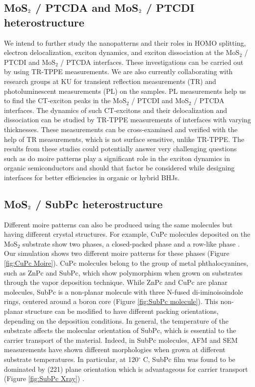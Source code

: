 \documentclass[12pt]{article}
\begin{document}
\subsection{MoS$\protect_2$ / PTCDA and MoS$\protect_2$ / PTCDI heterostructure}
 We intend to further study the nanopatterns and their roles in HOMO splitting, electron delocalization, exciton dynamics, and exciton dissociation at the MoS$_2$ / PTCDI and MoS$_2$ / PTCDA interfaces. These investigations can be carried out by using TR-TPPE measurements. We are also currently collaborating with research groups at KU for transient reflection measurements (TR) and photoluminescent measurements (PL) on the samples. PL measurements help us to find the CT-exciton peaks in the MoS$_2$ / PTCDI and MoS$_2$ / PTCDA interfaces. The dynamics of such CT-excitons and their delocalization and dissociation can be studied by TR-TPPE measurements of interfaces with varying thicknesses. These measurements can be cross-examined and verified with the help of TR measurements, which is not surface sensitive, unlike TR-TPPE. The results from these studies could potentially answer very challenging questions such as do moire patterns play a significant role in the exciton dynamics in organic semiconductors and should that factor be considered while designing interfaces for better efficiencies in organic or hybrid BHJs.

\subsection{MoS$\protect_2$ / SubPc heterostructure}
Different moire patterns can also be produced using the same molecules but having different crystal structures. For example, CuPc molecules deposited on the MoS$_2$ substrate show two phases, a closed-packed phase and a row-like phase \cite{ludwig1994epitaxy}. Our simulation shows two different moire patterns for these phases (Figure \ref{fig:CuPc Moire}). CuPc molecules belong to the group of metal phthalocyanines, such as ZnPc and SubPc, which show polymorphism when grown on substrates through the vapor deposition technique. While ZnPc and CuPc are planar molecules, SubPc is a non-planar molecule with three N-fused di-iminoisoindole rings, centered around a boron core (Figure \ref{fig:SubPc molecule}). This non-planar structure can be modified to have different packing orientations, depending on the deposition conditions. In general, the temperature of the substrate affects the molecular orientation of SubPc, which is essential to the carrier transport of the material. Indeed, in SubPc molecules, AFM and SEM measurements have shown different morphologies when grown at different substrate temperatures. In particular, at 120$^\circ$ C, SubPc film was found to be dominated by (221) plane orientation which is advantageous for carrier transport (Figure \ref{fig:SubPc Xray}) \cite{chou2012effect}.
\end{document}
